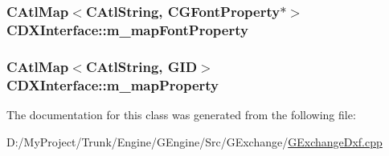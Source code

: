\subsubsection[{m\+\_\+map\+Font\+Property}]{\setlength{\rightskip}{0pt plus 5cm}C\+Atl\+Map$<$C\+Atl\+String, {\bf C\+G\+Font\+Property}$\ast$$>$ C\+D\+X\+Interface\+::m\+\_\+map\+Font\+Property}\label{class_c_d_x_interface_ae7eba4588b7a3d8264321425aec238ed}
\hypertarget{class_c_d_x_interface_a38dea6333c2f7a9436c293eb61dca870}{}
\subsubsection[{m\+\_\+map\+Property}]{\setlength{\rightskip}{0pt plus 5cm}C\+Atl\+Map$<$C\+Atl\+String, {\bf G\+I\+D}$>$ C\+D\+X\+Interface\+::m\+\_\+map\+Property}\label{class_c_d_x_interface_a38dea6333c2f7a9436c293eb61dca870}


The documentation for this class was generated from the following file\+:\begin{DoxyCompactItemize}
\item 
D\+:/\+My\+Project/\+Trunk/\+Engine/\+G\+Engine/\+Src/\+G\+Exchange/\hyperlink{_g_exchange_dxf_8cpp}{G\+Exchange\+Dxf.\+cpp}\end{DoxyCompactItemize}
